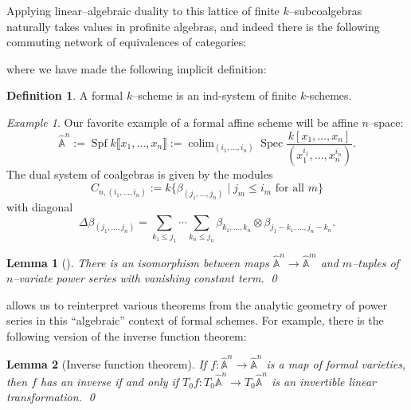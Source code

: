 \documentclass{amsart}
\newcommand{\A}{\widehat{\mathbb{A}}}
\newcommand{\<}{\langle}
\renewcommand{\>}{\rangle}
\newcommand{\CatOf}[1]{\mathsf{#1}}
\DeclareMathOperator{\Spec}{Spec}
\DeclareMathOperator{\Spf}{Spf}
\DeclareMathOperator{\colim}{colim}
\theoremstyle{plain}
\newtheorem*{lemma}{Lemma}
\theoremstyle{definition}
\newtheorem*{definition}{Definition}
\theoremstyle{remark}
\newtheorem*{example}{Example}
\begin{document}
Applying linear--algebraic duality to this lattice of finite $k$--subcoalgebras naturally takes values in profinite algebras, and indeed there is the following commuting network of equivalences of categories:
\begin{center}
\end{center}
where we have made the following implicit definition:
\begin{definition}
A formal $k$--scheme is an ind-system of finite $k$-schemes.
\end{definition}

\begin{example}\label{AffineSpaceFormulas}
Our favorite example of a formal affine scheme will be affine $n$--space: \[\A^n := \Spf k\llbracket x_1, \ldots, x_n \rrbracket := \colim_{(i_1, \ldots, i_n)} \Spec \frac{k[x_1, \ldots, x_n]}{(x_1^{i_1}, \ldots, x_n^{i_n})}.\]  The dual system of coalgebras is given by the modules \[C_{n, (i_1, \ldots, i_n)} := k\{\beta_{(j_1, \ldots, j_n)} \mid \text{$j_m \le i_m$ for all $m$}\}\] with diagonal \[\Delta \beta_{(j_1, \ldots, j_n)} = \sum_{k_1 \le j_1} \cdots \sum_{k_n \le j_n} \beta_{k_1, \ldots, k_n} \otimes \beta_{j_1 - k_1, \ldots, j_n - k_n}.\]
\end{example}

\begin{lemma}[{\cite[pg.\ 32]{StricklandFSFG}}]\label{EARLYMapsOfAffineSpaces}
There is an isomorphism between maps $\A^n \to \A^m$ and $m$--tuples of $n$--variate power series with vanishing constant term. \qed
\end{lemma}

 allows us to reinterpret various theorems from the analytic geometry of power series in this ``algebraic'' context of formal schemes.  For example, there is the following version of the inverse function theorem:

\begin{lemma}[Inverse function theorem]\label{InverseFunctionTheorem}
If $f: \A^n \to \A^n$ is a map of formal varieties, then $f$ has an inverse if and only if $T_0 f: T_0 \A^n \to T_0 \A^n$ is an invertible linear transformation. \qed
\end{lemma}
\end{document}
